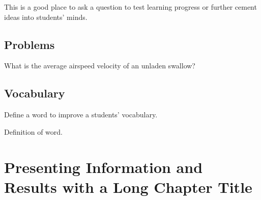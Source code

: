 \documentclass[
	11pt, %
	fleqn, %
	letterpaper, %
]{CommodoreBlueBook}
\begin{document}
\begin{exercise} %

	This is a good place to ask a question to test learning progress or further
	cement ideas into students' minds.

\end{exercise}



\section{Problems}

\begin{problem} %
	What is the average airspeed velocity of an unladen swallow?
\end{problem}


\section{Vocabulary}

Define a word to improve a students' vocabulary.

\begin{vocabulary}[Word] %
	Definition of word.
\end{vocabulary}


\chapterspaceabove{6.25cm} %
\chapterspacebelow{7.5cm} %


\chapter{Presenting Information and Results with a Long Chapter Title}
\end{document}
